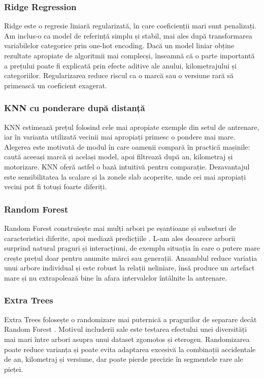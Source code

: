 \subsubsection{Ridge Regression}

Ridge este o regresie liniară regularizată, în care coeficienții mari sunt penalizați. Am inclus-o ca model de referință simplu și stabil, mai ales după transformarea variabilelor categorice prin one-hot encoding. Dacă un model liniar obține rezultate apropiate de algoritmii mai complecși, înseamnă că o parte importantă a prețului poate fi explicată prin efecte aditive ale anului, kilometrajului și categoriilor. Regularizarea reduce riscul ca o marcă sau o versiune rară să primească un coeficient exagerat.

\subsubsection{KNN cu ponderare după distanță}

KNN estimează prețul folosind cele mai apropiate exemple din setul de antrenare, iar în varianta utilizată vecinii mai apropiați primesc o pondere mai mare. Alegerea este motivată de modul în care oamenii compară în practică mașinile: caută aceeași marcă și același model, apoi filtrează după an, kilometraj și motorizare. KNN oferă astfel o bază intuitivă pentru comparație. Dezavantajul este sensibilitatea la scalare și la zonele slab acoperite, unde cei mai apropiați vecini pot fi totuși foarte diferiți.

\subsubsection{Random Forest}

Random Forest construiește mai mulți arbori pe eșantioane și subseturi de caracteristici diferite, apoi mediază predicțiile \cite{breiman2001random}. L-am ales deoarece arborii surprind natural praguri și interacțiuni, de exemplu situația în care o putere mare crește prețul doar pentru anumite mărci sau generații. Ansamblul reduce variația unui arbore individual și este robust la relații neliniare, însă produce un artefact mare și nu extrapolează bine în afara intervalelor întâlnite la antrenare.

\subsubsection{Extra Trees}

Extra Trees folosește o randomizare mai puternică a pragurilor de separare decât Random Forest \cite{geurts2006extremely}. Motivul includerii sale este testarea efectului unei diversități mai mari între arbori asupra unui dataset zgomotos și eterogen. Randomizarea poate reduce varianța și poate evita adaptarea excesivă la combinații accidentale de an, kilometraj și versiune, dar poate pierde precizie în segmentele rare ale pieței.

